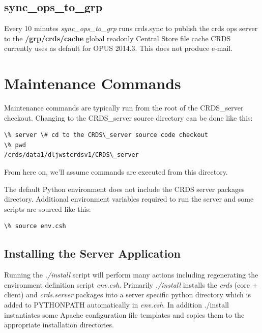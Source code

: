 \documentclass[letterpaper,10pt,english]{sphinxmanual}
\begin{document}
\section{sync\_ops\_to\_grp}
\label{server_guide:sync-ops-to-grp}
Every 10 minutes \emph{sync\_ops\_to\_grp} runs crds.sync to publish the crds ops server to the \textbf{/grp/crds/cache} global readonly
Central Store file cache CRDS currently uses as default for OPUS 2014.3.   This does not produce e-mail.


\chapter{Maintenance Commands}
\label{server_guide:maintenance-commands}
Maintenance commands are typically run from the root of the CRDS\_server checkout.   Changing to the CRDS\_server source
directory can be done like this:

\begin{Verbatim}[commandchars=\\\{\}]
\% server \# cd to the CRDS\_server source code checkout
\% pwd
/crds/data1/dljwstcrdsv1/CRDS\_server
\end{Verbatim}

From here on,  we'll assume commands are executed from this directory.

The default Python environment does not include the CRDS server packages directory.   Additional environment variables
required to run the server and some scripts are sourced like this:

\begin{Verbatim}[commandchars=\\\{\}]
\% source env.csh
\end{Verbatim}


\section{Installing the Server Application}
\label{server_guide:installing-the-server-application}
Running the \emph{./install} script will perform many actions including regenerating the environment definition script
\emph{env.csh}.  Primarily \emph{./install} installs the \emph{crds} (core + client) and \emph{crds.server} packages into
a server specific python directory which is added to PYTHONPATH automatically in \emph{env.csh}.  In addition ./install
instantiates some Apache configuration file templates and copies them to the appropriate installation directories.
\end{document}
